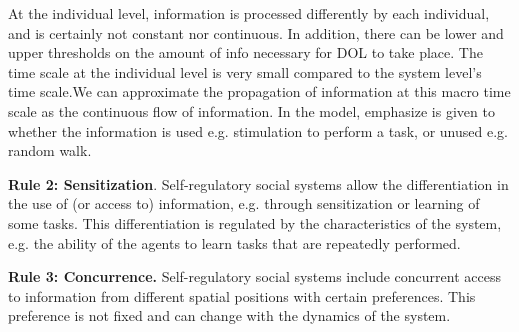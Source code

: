 \documentclass[final,5p,times,twocolumn]{elsarticle}
\begin{document}
At the individual level, information is processed differently by each individual, and is certainly not constant nor continuous. In addition, there can be lower and upper thresholds on the amount of info necessary for DOL to take place. The time scale at the individual level is very small compared to the system level's time scale.We can approximate the propagation of information at this macro time scale as the continuous flow of information.  In the model, emphasize is given to whether the information is used e.g. stimulation to perform a task, or unused e.g. random walk.

\textbf{Rule 2: Sensitization}. Self-regulatory social systems allow the differentiation in the use of  (or access to) information, e.g. through sensitization or learning of some tasks. This differentiation is regulated by the characteristics of the system, e.g. the ability of the agents to learn tasks that are repeatedly performed.

\textbf{Rule 3: Concurrence.} Self-regulatory social systems include concurrent access to information from different spatial positions with certain preferences. This preference is not fixed and can change with the dynamics of the system. 
\end{document}
